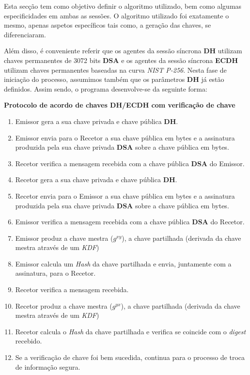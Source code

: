 \documentclass[11pt]{article}
\providecommand{\tightlist}{%
      \setlength{\itemsep}{0pt}\setlength{\parskip}{0pt}}
\begin{document}
    Esta secção tem como objetivo definir o algoritmo utilizado, bem como
algumas especificidades em ambas as sessões. O algoritmo utilizado foi
exatamente o mesmo, apenas aspetos específicos tais como, a geração das
chaves, se diferenciaram.

    Além disso, é conveniente referir que os agentes da sessão síncrona
\textbf{DH} utilizam chaves permanentes de 3072 bits \textbf{DSA} e os
agentes da sessão síncrona \textbf{ECDH} utilizam chaves permanentes
baseadas na curva \emph{NIST P-256}. Nesta fase de iniciação do processo,
assumimos também que os parâmetros \textbf{DH} já estão definidos. Assim
sendo, o programa desenvolve-se da seguinte forma:

\textbf{Protocolo de acordo de chaves DH/ECDH com verificação de chave}

\begin{enumerate}
\def\labelenumi{\arabic{enumi}.}
\tightlist
\item
  Emissor gera a sua chave privada e chave pública \textbf{DH}.
\item
  Emissor envia para o Recetor a sua chave pública em bytes e a
  assinatura produzida pela sua chave privada \textbf{DSA} sobre a chave
  pública em bytes.
\item
  Recetor verifica a mensagem recebida com a chave pública \textbf{DSA}
  do Emissor.
\item
  Recetor gera a sua chave privada e chave pública \textbf{DH}.
\item
  Recetor envia para o Emissor a sua chave pública em bytes e a
  assinatura produzida pela sua chave privada \textbf{DSA} sobre a chave
  pública em bytes.
\item
  Emissor verifica a mensagem recebida com a chave pública \textbf{DSA}
  do Recetor.
\item
  Emissor produz a chave mestra (\(g^{xy}\)), a chave partilhada
  (derivada da chave mestra através de um \emph{KDF})
\item
  Emissor calcula um \emph{Hash} da chave partilhada e envia, juntamente
  com a assinatura, para o Recetor.
\item
  Recetor verifica a mensagem recebida.
\item
  Recetor produz a chave mestra (\(g^{yx}\)), a chave partilhada
  (derivada da chave mestra através de um \emph{KDF})
\item
  Recetor calcula o \emph{Hash} da chave partilhada e verifica se
  coincide com o \emph{digest} recebido.
\item
  Se a verificação de chave foi bem sucedida, continua para o processo
  de troca de informação segura.
\end{enumerate}
\end{document}
